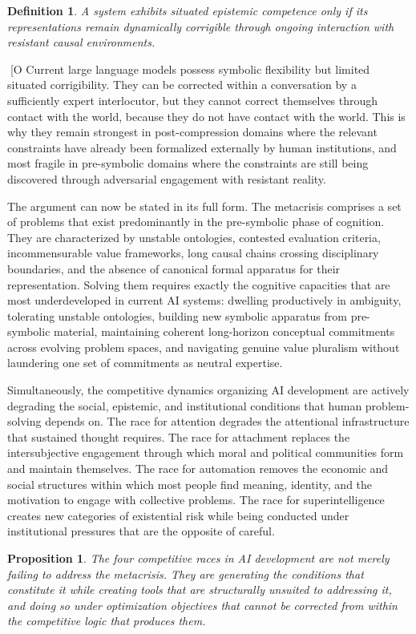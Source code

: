 \documentclass[12pt, a4paper]{article}
\newtheorem{proposition}[theorem]{Proposition}
\newtheorem{definition}[theorem]{Definition}
\theoremstyle{remark}
\begin{document}
\begin{definition}
A system exhibits \emph{situated epistemic competence} only if its representations remain dynamically corrigible through ongoing interaction with resistant causal environments.
\end{definition}
[O
Current large language models possess symbolic flexibility but limited situated corrigibility. They can be corrected within a conversation by a sufficiently expert interlocutor, but they cannot correct themselves through contact with the world, because they do not have contact with the world. This is why they remain strongest in post-compression domains where the relevant constraints have already been formalized externally by human institutions, and most fragile in pre-symbolic domains where the constraints are still being discovered through adversarial engagement with resistant reality.

The argument can now be stated in its full form. The metacrisis comprises a set of problems that exist predominantly in the pre-symbolic phase of cognition. They are characterized by unstable ontologies, contested evaluation criteria, incommensurable value frameworks, long causal chains crossing disciplinary boundaries, and the absence of canonical formal apparatus for their representation. Solving them requires exactly the cognitive capacities that are most underdeveloped in current AI systems: dwelling productively in ambiguity, tolerating unstable ontologies, building new symbolic apparatus from pre-symbolic material, maintaining coherent long-horizon conceptual commitments across evolving problem spaces, and navigating genuine value pluralism without laundering one set of commitments as neutral expertise.

Simultaneously, the competitive dynamics organizing AI development are actively degrading the social, epistemic, and institutional conditions that human problem-solving depends on. The race for attention degrades the attentional infrastructure that sustained thought requires. The race for attachment replaces the intersubjective engagement through which moral and political communities form and maintain themselves. The race for automation removes the economic and social structures within which most people find meaning, identity, and the motivation to engage with collective problems. The race for superintelligence creates new categories of existential risk while being conducted under institutional pressures that are the opposite of careful.

\begin{proposition}
The four competitive races in AI development are not merely failing to address the metacrisis. They are generating the conditions that constitute it while creating tools that are structurally unsuited to addressing it, and doing so under optimization objectives that cannot be corrected from within the competitive logic that produces them.
\end{proposition}
\end{document}
